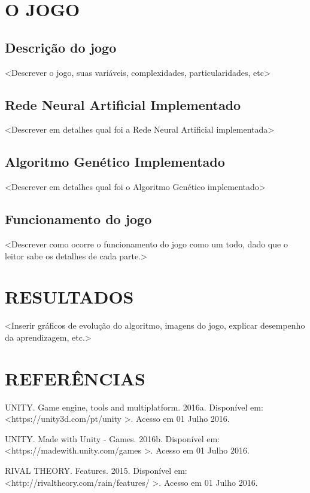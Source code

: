 \documentclass[12pt,a4paper]{article}
\begin{document}
\section{O JOGO}
	
	\subsection{Descrição do jogo}
	<Descrever o jogo, suas variáveis, complexidades, particularidades, etc>
	
	\subsection{Rede Neural Artificial Implementado}
	<Descrever em detalhes qual foi a Rede Neural Artificial implementada>
	
	\subsection{Algoritmo Genético Implementado}
	<Descrever em detalhes qual foi o Algoritmo Genético implementado>
	
	\subsection{Funcionamento do jogo}
	<Descrever como ocorre o funcionamento do jogo como um todo, dado que o leitor sabe os detalhes de cada parte.>


\newpage %
\section{RESULTADOS}
	<Inserir gráficos de evolução do algoritmo, imagens do jogo, explicar desempenho da aprendizagem, etc.>

\newpage %
\section*{REFERÊNCIAS}
	\singlespace
	UNITY. Game engine, tools and multiplatform. 2016a. Disponível em: \linebreak \textless https://unity3d.com/pt/unity \textgreater. Acesso em 01 Julho 2016.\par
	UNITY. Made with Unity - Games. 2016b. Disponível em: \linebreak \textless https://madewith.unity.com/games \textgreater. Acesso em 01 Julho 2016.\par
	RIVAL THEORY. Features. 2015. Disponível em: \linebreak \textless http://rivaltheory.com/rain/features/ \textgreater. Acesso em 01 Julho 2016.\par
\end{document}
